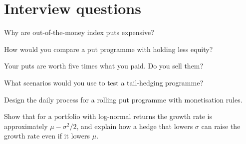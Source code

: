 \section{Interview questions}

\begin{interviewq}\label{iq:s2:tail-hedging-and-long-volatility:1}
Why are out-of-the-money index puts expensive?
\end{interviewq}

\begin{interviewq}\label{iq:s2:tail-hedging-and-long-volatility:2}
How would you compare a put programme with holding less equity?
\end{interviewq}

\begin{interviewq}\label{iq:s2:tail-hedging-and-long-volatility:3}
Your puts are worth five times what you paid. Do you sell them?
\end{interviewq}

\begin{interviewq}\label{iq:s2:tail-hedging-and-long-volatility:4}
What scenarios would you use to test a tail-hedging programme?
\end{interviewq}

\begin{interviewq}\label{iq:s2:tail-hedging-and-long-volatility:5}
Design the daily process for a rolling put programme with monetisation rules.
\end{interviewq}

\begin{interviewq}\label{iq:s2:tail-hedging-and-long-volatility:6}
Show that for a portfolio with log-normal returns the growth rate is approximately $\mu - \sigma^2/2$, and explain how a hedge that lowers $\sigma$ can
raise the growth rate even if it lowers $\mu$.
\end{interviewq}
